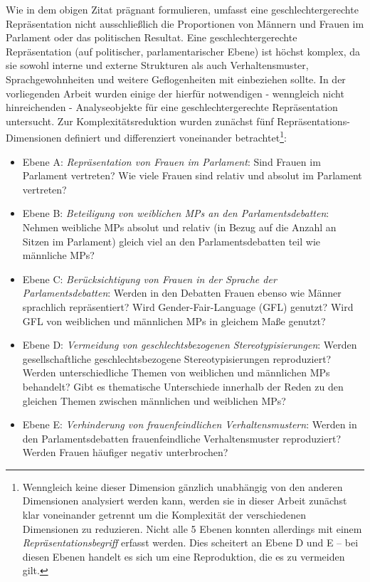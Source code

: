 \documentclass[12pt, 
    twoside=false, 
    bibliography=totoc, 
    numbers=endperiod, 
    headings=normal, 
    toc=chapterentrydotfill
    ]{scrbook}
\begin{document}
Wie \textcite{erikson_2018} in dem obigen Zitat prägnant formulieren, umfasst eine geschlechtergerechte Repräsentation nicht ausschließlich die Proportionen von Männern und Frauen im Parlament oder das politischen Resultat. Eine geschlechtergerechte Repräsentation (auf politischer, parlamentarischer Ebene) ist höchst komplex, da sie sowohl interne und externe Strukturen als auch Verhaltensmuster, Sprachgewohnheiten und weitere Geflogenheiten mit einbeziehen sollte. In der vorliegenden Arbeit wurden einige der hierfür notwendigen - wenngleich nicht hinreichenden - Analyseobjekte für eine geschlechtergerechte Repräsentation untersucht. Zur Komplexitätsreduktion wurden zunächst fünf Repräsentations-Dimensionen definiert und differenziert voneinander betrachtet\footnote{Wenngleich keine dieser Dimension gänzlich unabhängig von den anderen Dimensionen analysiert werden kann, werden sie in dieser Arbeit zunächst klar voneinander getrennt um die Komplexität der verschiedenen Dimensionen zu reduzieren. Nicht alle 5 Ebenen konnten allerdings mit einem \emph{Repräsentationsbegriff} erfasst werden. Dies scheitert an Ebene D und E -- bei diesen Ebenen handelt es sich um eine Reproduktion, die es zu vermeiden gilt.}: 
\begin{itemize}
    \item Ebene A: \emph{Repräsentation von Frauen im Parlament}: Sind Frauen im Parlament vertreten? Wie viele Frauen sind relativ und absolut im Parlament vertreten? 
    \item Ebene B: \emph{Beteiligung von weiblichen MPs an den Parlamentsdebatten}: Nehmen weibliche MPs absolut und relativ (in Bezug auf die Anzahl an Sitzen im Parlament) gleich viel an den Parlamentsdebatten teil wie männliche MPs? 
    \item Ebene C: \emph{Berücksichtigung von Frauen in der Sprache der Parlamentsdebatten}: Werden in den Debatten Frauen ebenso wie Männer sprachlich repräsentiert? Wird Gender-Fair-Language (GFL) genutzt? Wird GFL von weiblichen und männlichen MPs in gleichem Maße genutzt? 
    \item Ebene D: \emph{Vermeidung von geschlechtsbezogenen Stereotypisierungen}: Werden gesellschaftliche geschlechtsbezogene Stereotypisierungen reproduziert? Werden unterschiedliche Themen von weiblichen und männlichen MPs behandelt? Gibt es thematische Unterschiede innerhalb der Reden zu den gleichen Themen zwischen männlichen und weiblichen MPs? 
    \item Ebene E: \emph{Verhinderung von frauenfeindlichen Verhaltensmustern}: Werden in den Parlamentsdebatten frauenfeindliche Verhaltensmuster reproduziert? Werden Frauen häufiger negativ unterbrochen? 
\end{itemize}
\end{document}
